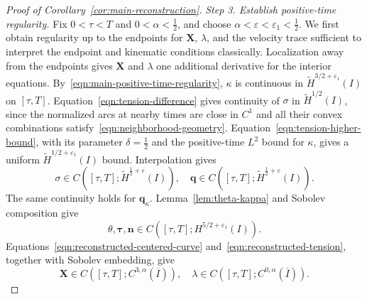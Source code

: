 \documentclass[11pt,reqno]{amsart}
\theoremstyle{plain}
\theoremstyle{definition}
\numberwithin{equation}{section}
\newcommand{\paren}[1]{\left(#1\right)}
\newcommand{\wt}[1]{\widetilde{#1}}
\newcommand{\bm}[1]{\boldsymbol{#1}}
\newcommand{\thi}[1]{\wt H^{#1}(I)}
\begin{document}
\begin{proof}[Proof of Corollary~\ref{cor:main-reconstruction}]
\emph{Step 3. Establish positive-time regularity.}
Fix $0<\tau<T$ and $0<\alpha<\frac12$, and choose
$\alpha<\varepsilon<\varepsilon_1<\frac12$.
We first obtain regularity up to the endpoints for $\bm X$, $\lambda$, and the velocity
trace sufficient to interpret the endpoint and kinematic conditions
classically. Localization away from the endpoints gives $\bm X$ and
$\lambda$ one additional derivative for the interior equations.
By~\eqref{eqn:main-positive-time-regularity}, $\kappa$ is continuous in
$\thi{3/2+\varepsilon_1}$ on $[\tau,T]$.
Equation~\eqref{eqn:tension-difference} gives continuity of $\sigma$ in $\thi{1/2}$,
since the normalized arcs at nearby times are close in $C^1$ and all their
convex combinations satisfy~\eqref{eqn:neighborhood-geometry}. Equation~\eqref{eqn:tension-higher-bound}, with its parameter
$\delta=\frac12$ and the positive-time $L^2$ bound for $\kappa$, gives a
uniform $\thi{1/2+\varepsilon_1}$ bound. Interpolation gives
\begin{equation}\label{eqn:reconstruction-positive-time-tension}
    \sigma\in C\paren{[\tau,T];\thi{\frac12+\varepsilon}},
    \quad
    \bm q\in C\paren{[\tau,T];\thi{\frac12+\varepsilon}}.
\end{equation}
The same continuity holds for $\bm q_\kappa$.
Lemma~\ref{lem:theta-kappa} and Sobolev composition give
\begin{equation*}
    \theta,\bm\tau,\bm n
    \in C\paren{[\tau,T];H^{5/2+\varepsilon_1}(I)}.
\end{equation*}
Equations~\eqref{eqn:reconstructed-centered-curve} and~\eqref{eqn:reconstructed-tension}, together with Sobolev embedding, give
\begin{equation}
    \bm X\in C\paren{[\tau,T];C^{3,\alpha}(\overline I)},
    \quad
    \lambda\in C\paren{[\tau,T];C^{0,\alpha}(\overline I)}.
\end{equation}


\end{proof}
\end{document}
